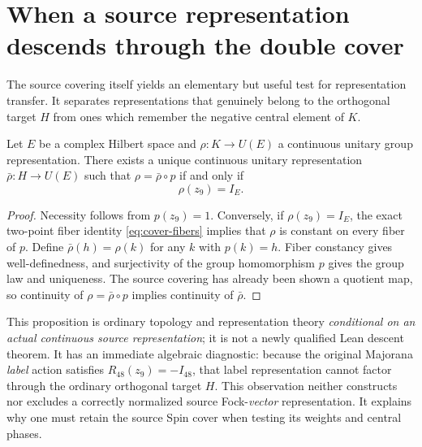 \section{When a source representation descends through the double cover}
The source covering itself yields an elementary but useful test for
representation transfer. It separates representations that genuinely
belong to the orthogonal target $H$ from ones which remember the
negative central element of $K$.

\begin{proposition}\label{prop:source-cover-descent}
Let $E$ be a complex Hilbert space and
$\rho:K\to U(E)$ a continuous unitary group representation.
There exists a unique continuous unitary representation
$\bar\rho:H\to U(E)$ such that $\rho=\bar\rho\circ p$ if and only if
\begin{equation}\label{eq:source-cover-descent}
 \rho(z_9)=I_E.
\end{equation}
\end{proposition}
\begin{proof}
Necessity follows from $p(z_9)=1$. Conversely, if
$\rho(z_9)=I_E$, the exact two-point fiber identity
\eqref{eq:cover-fibers} implies that $\rho$ is constant on every
fiber of $p$. Define $\bar\rho(h)=\rho(k)$ for any $k$ with
$p(k)=h$. Fiber constancy gives well-definedness, and
surjectivity of the group homomorphism $p$ gives the group law
and uniqueness. The source covering has already been shown a
quotient map, so continuity of $\rho=\bar\rho\circ p$ implies
continuity of $\bar\rho$.
\end{proof}
This proposition is ordinary topology and representation theory
\emph{conditional on an actual continuous source representation};
it is not a newly qualified Lean descent theorem. It has an
immediate algebraic diagnostic: because the original Majorana
\emph{label} action satisfies $R_{48}(z_9)=-I_{48}$, that label
representation cannot factor through the ordinary orthogonal
target $H$. This observation neither constructs nor excludes
a correctly normalized source Fock-\emph{vector} representation.
It explains why one must retain the source Spin cover when
testing its weights and central phases.

